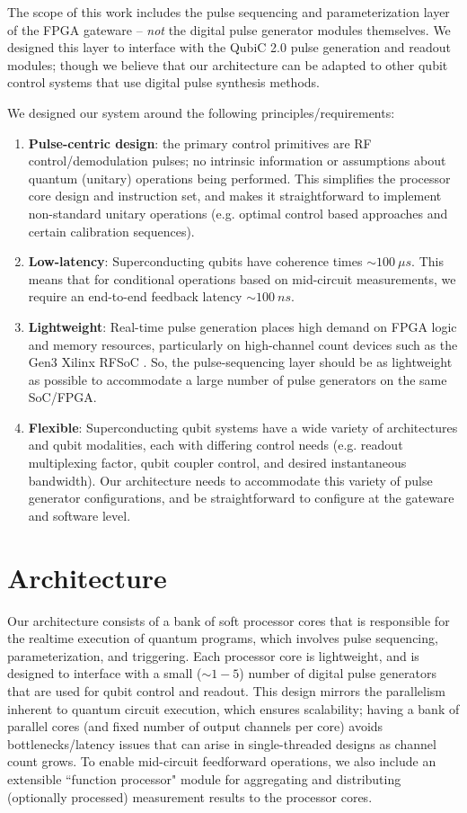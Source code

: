 \documentclass[journal]{IEEEtran}
\begin{document}
The scope of this work includes the pulse sequencing and parameterization layer of the FPGA gateware -- \textit{not} the digital pulse generator modules themselves. We designed this layer to interface with the QubiC 2.0 \cite{xu2023qubic} pulse generation and readout modules; though we believe that our architecture can be adapted to other qubit control systems that use digital pulse synthesis methods. 

We designed our system around the following principles/requirements:
\begin{enumerate}
    \item \textbf{Pulse-centric design}: the primary control primitives are RF control/demodulation pulses; no intrinsic information or assumptions about quantum (unitary) operations being performed. This simplifies the processor core design and instruction set, and makes it straightforward to implement non-standard unitary operations (e.g. optimal control based approaches and certain calibration sequences\cite{werschnik2007quantum}).
    \item \textbf{Low-latency}: Superconducting qubits have coherence times $\sim 100\ \mu s$. This means that for conditional operations based on mid-circuit measurements, we require an end-to-end feedback latency $\sim 100\ ns$. 
    \item \textbf{Lightweight}: Real-time pulse generation places high demand on FPGA logic and memory resources, particularly on high-channel count devices such as the Gen3 Xilinx RFSoC \cite{farley2018all}. So, the pulse-sequencing layer should be as lightweight as possible to accommodate a large number of pulse generators on the same SoC/FPGA. 
    \item \textbf{Flexible}: Superconducting qubit systems have a wide variety of architectures and qubit modalities, each with differing control needs (e.g. readout multiplexing factor, qubit coupler control, and desired instantaneous bandwidth). Our architecture needs to accommodate this variety of pulse generator configurations, and be straightforward to configure at the gateware and software level.
\end{enumerate}

\section{Architecture}

Our architecture consists of a bank of soft processor cores that is responsible for the realtime execution of quantum programs, which involves pulse sequencing, parameterization, and triggering. Each processor core is lightweight, and is designed to interface with a small ($\sim 1 - 5$) number of digital pulse generators that are used for qubit control and readout. This design mirrors the parallelism inherent to quantum circuit execution, which ensures scalability; having a bank of parallel cores (and fixed number of output channels per core) avoids bottlenecks/latency issues that can arise in single-threaded designs as channel count grows. To enable mid-circuit feedforward operations, we also include an extensible ``function processor" module for aggregating and distributing (optionally processed) measurement results to the processor cores. 
\end{document}
